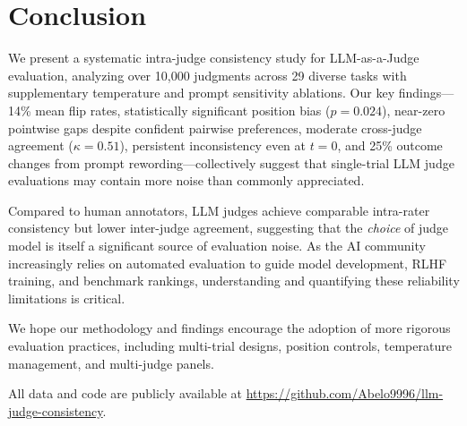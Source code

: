 \documentclass{ijclclp}
\begin{document}
\section{Conclusion}

We present a systematic intra-judge consistency study for LLM-as-a-Judge evaluation, analyzing over 10,000 judgments across 29 diverse tasks with supplementary temperature and prompt sensitivity ablations. Our key findings---14\% mean flip rates, statistically significant position bias ($p = 0.024$), near-zero pointwise gaps despite confident pairwise preferences, moderate cross-judge agreement ($\kappa = 0.51$), persistent inconsistency even at $t=0$, and 25\% outcome changes from prompt rewording---collectively suggest that single-trial LLM judge evaluations may contain more noise than commonly appreciated.

Compared to human annotators, LLM judges achieve comparable intra-rater consistency but lower inter-judge agreement, suggesting that the \textit{choice} of judge model is itself a significant source of evaluation noise. As the AI community increasingly relies on automated evaluation to guide model development, RLHF training, and benchmark rankings, understanding and quantifying these reliability limitations is critical.

We hope our methodology and findings encourage the adoption of more rigorous evaluation practices, including multi-trial designs, position controls, temperature management, and multi-judge panels.

All data and code are publicly available at \url{https://github.com/Abelo9996/llm-judge-consistency}.


\end{document}
